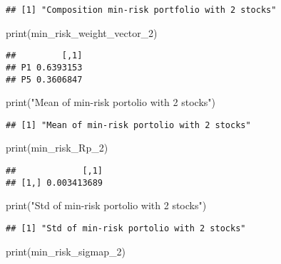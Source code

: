 \documentclass[
]{article}
\newenvironment{Shaded}{\begin{snugshade}}{\end{snugshade}}
\newcommand{\FunctionTok}[1]{\textcolor[rgb]{0.00,0.00,0.00}{#1}}
\newcommand{\NormalTok}[1]{#1}
\newcommand{\StringTok}[1]{\textcolor[rgb]{0.31,0.60,0.02}{#1}}
\begin{document}
\begin{verbatim}
## [1] "Composition min-risk portfolio with 2 stocks"
\end{verbatim}

\begin{Shaded}
\begin{Highlighting}[]
\FunctionTok{print}\NormalTok{(min\_risk\_weight\_vector\_2)}
\end{Highlighting}
\end{Shaded}

\begin{verbatim}
##         [,1]
## P1 0.6393153
## P5 0.3606847
\end{verbatim}

\begin{Shaded}
\begin{Highlighting}[]
\FunctionTok{print}\NormalTok{(}\StringTok{"Mean of min{-}risk portolio with 2 stocks"}\NormalTok{)}
\end{Highlighting}
\end{Shaded}

\begin{verbatim}
## [1] "Mean of min-risk portolio with 2 stocks"
\end{verbatim}

\begin{Shaded}
\begin{Highlighting}[]
\FunctionTok{print}\NormalTok{(min\_risk\_Rp\_2)}
\end{Highlighting}
\end{Shaded}

\begin{verbatim}
##             [,1]
## [1,] 0.003413689
\end{verbatim}

\begin{Shaded}
\begin{Highlighting}[]
\FunctionTok{print}\NormalTok{(}\StringTok{"Std of min{-}risk portolio with 2 stocks"}\NormalTok{)}
\end{Highlighting}
\end{Shaded}

\begin{verbatim}
## [1] "Std of min-risk portolio with 2 stocks"
\end{verbatim}

\begin{Shaded}
\begin{Highlighting}[]
\FunctionTok{print}\NormalTok{(min\_risk\_sigmap\_2)}
\end{Highlighting}
\end{Shaded}
\end{document}
